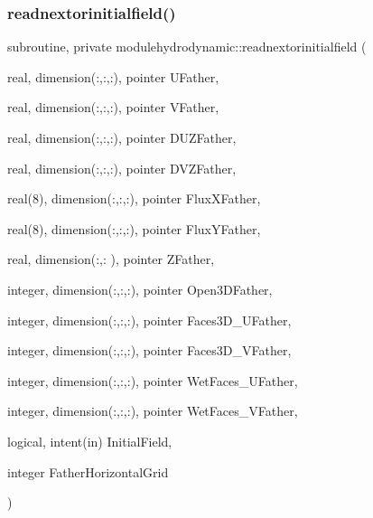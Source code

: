 \subsubsection{\texorpdfstring{readnextorinitialfield()}{readnextorinitialfield()}}
{\footnotesize\ttfamily subroutine, private modulehydrodynamic\+::readnextorinitialfield (\begin{DoxyParamCaption}\item[{real, dimension(\+:,\+:,\+:), pointer}]{U\+Father,  }\item[{real, dimension(\+:,\+:,\+:), pointer}]{V\+Father,  }\item[{real, dimension(\+:,\+:,\+:), pointer}]{D\+U\+Z\+Father,  }\item[{real, dimension(\+:,\+:,\+:), pointer}]{D\+V\+Z\+Father,  }\item[{real(8), dimension(\+:,\+:,\+:), pointer}]{Flux\+X\+Father,  }\item[{real(8), dimension(\+:,\+:,\+:), pointer}]{Flux\+Y\+Father,  }\item[{real, dimension(\+:,\+:  ), pointer}]{Z\+Father,  }\item[{integer, dimension(\+:,\+:,\+:), pointer}]{Open3\+D\+Father,  }\item[{integer, dimension(\+:,\+:,\+:), pointer}]{Faces3\+D\+\_\+\+U\+Father,  }\item[{integer, dimension(\+:,\+:,\+:), pointer}]{Faces3\+D\+\_\+\+V\+Father,  }\item[{integer, dimension(\+:,\+:,\+:), pointer}]{Wet\+Faces\+\_\+\+U\+Father,  }\item[{integer, dimension(\+:,\+:,\+:), pointer}]{Wet\+Faces\+\_\+\+V\+Father,  }\item[{logical, intent(in)}]{Initial\+Field,  }\item[{integer}]{Father\+Horizontal\+Grid }\end{DoxyParamCaption})\hspace{0.3cm}{\ttfamily [private]}}

